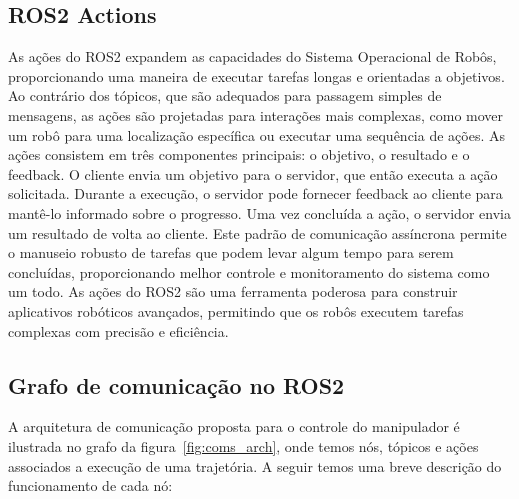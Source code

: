 \subsection*{ROS2 Actions}

As ações do ROS2 expandem as capacidades do Sistema Operacional de Robôs,
proporcionando uma maneira de executar tarefas longas e orientadas a objetivos.
Ao contrário dos tópicos, que são adequados para passagem simples de mensagens,
as ações são projetadas para interações mais complexas, como mover um robô para
uma localização específica ou executar uma sequência de ações. As ações
consistem em três componentes principais: o objetivo, o resultado e o feedback.
O cliente envia um objetivo para o servidor, que então executa a ação
solicitada. Durante a execução, o servidor pode fornecer feedback ao cliente
para mantê-lo informado sobre o progresso. Uma vez concluída a ação, o servidor
envia um resultado de volta ao cliente. Este padrão de comunicação assíncrona
permite o manuseio robusto de tarefas que podem levar algum tempo para serem
concluídas, proporcionando melhor controle e monitoramento do sistema como um
todo. As ações do ROS2 são uma ferramenta poderosa para construir aplicativos
robóticos avançados, permitindo que os robôs executem tarefas complexas com
precisão e eficiência.

\subsection*{Grafo de comunicação no ROS2}

A arquitetura de comunicação proposta para o controle do manipulador é
ilustrada no grafo da figura~\ref{fig:coms_arch}, onde temos nós, tópicos e
ações associados a execução de uma trajetória. A seguir temos uma breve
descrição do funcionamento de cada nó:

